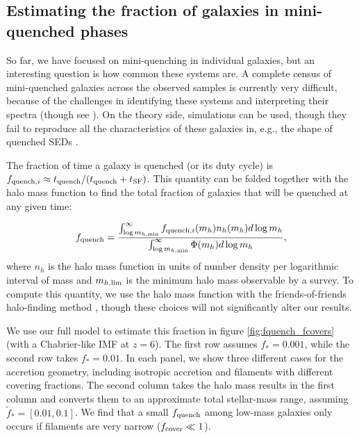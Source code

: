 \documentclass[a4paper,11pt]{article}
\begin{document}
\subsection{Estimating the fraction of galaxies in mini-quenched phases} \label{sec:fquench}

So far, we have focused on mini-quenching in individual galaxies, but an interesting question is how common these systems are. A complete census of mini-quenched galaxies across the observed samples is currently very difficult, because of the challenges in identifying these systems and interpreting their spectra (though see \cite{Yang2025, Khullar2026}). On the theory side, simulations can be used, though they fail to reproduce all the characteristics of these galaxies in, e.g., the shape of quenched SEDs \cite{Gelli2023, Dome2024}. 

The fraction of time a galaxy is quenched (or its duty cycle) is $f_{\mathrm{quench}, i} \approx t_{\rm quench} / (t_{\rm quench} + t_{\rm SF})$. This quantity can be folded together with the halo mass function to find the total fraction of galaxies that will be quenched at any given time:

\begin{equation}
    f_{\rm quench} = \frac{\int_{\log m_{h, \rm min}}^{\infty} f_{\mathrm{quench}, i}(m_{h}) n_h(m_{h}) d\log m_{h}}{\int_{\log m_{h, \rm min}}^{\infty} \Phi(m_{h}) d\log m_{h}},
    \label{eq:f_quench}
\end{equation}
%
where $n_h$ is the halo mass function in units of number density per logarithmic interval of mass and $m_{h, \rm lim}$ is the minimum halo mass observable by a survey. To compute this quantity, we use the \cite{Watson2013_HMF} halo mass function with the friends-of-friends halo-finding method \cite{Davis1985_fof}, though these choices will not significantly alter our results.

We use our full model to estimate this fraction in figure \ref{fig:fquench_fcovers} (with a Chabrier-like IMF at $z = 6$). The first row assumes $f_{*} = 0.001$, while the second row takes $f_{*} = 0.01$. In each panel, we show three different cases for the accretion geometry, including isotropic accretion and filaments with different covering fractions. 
The second column takes the halo mass results in the first column and converts them to an approximate total stellar-mass range, assuming $\tilde{f}_{*} = [0.01,0.1]$. We find that a small $f_{\rm quench}$ among low-mass galaxies only occurs if filaments are very narrow ($f_{\rm cover} \ll 1$). 
\end{document}
